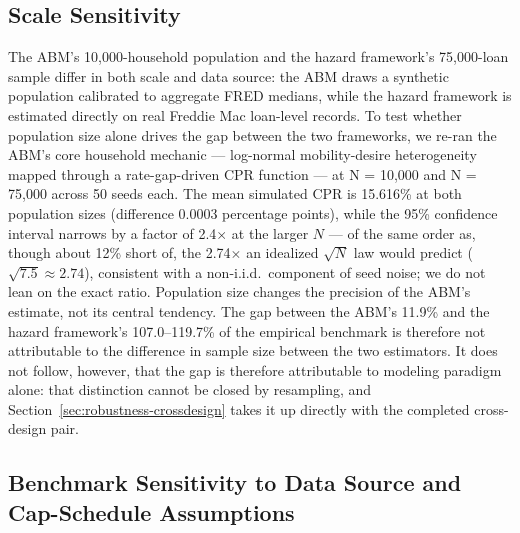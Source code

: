 \documentclass[12pt]{article}
\begin{document}
\subsection{Scale Sensitivity}\label{sec:robustness-scale}

The ABM's 10,000-household population and the hazard framework's 75,000-loan sample differ in both scale and data source: the ABM draws a synthetic population calibrated to aggregate FRED medians, while the hazard framework is estimated directly on real Freddie Mac loan-level records. To test whether population size alone drives the gap between the two frameworks, we re-ran the ABM's core household mechanic --- log-normal mobility-desire heterogeneity mapped through a rate-gap-driven CPR function --- at N = 10,000 and N = 75,000 across 50 seeds each. The mean simulated CPR is 15.616\% at both population sizes (difference 0.0003 percentage points), while the 95\% confidence interval narrows by a factor of 2.4$\times$ at the larger $N$ --- of the same order as, though about 12\% short of, the 2.74$\times$ an idealized $\sqrt{N}$ law would predict ($\sqrt{7.5} \approx 2.74$), consistent with a non-i.i.d.\ component of seed noise; we do not lean on the exact ratio. Population size changes the precision of the ABM's estimate, not its central tendency. The gap between the ABM's 11.9\% and the hazard framework's 107.0--119.7\% of the empirical benchmark is therefore not attributable to the difference in sample size between the two estimators. It does not follow, however, that the gap is therefore attributable to modeling paradigm alone: that distinction cannot be closed by resampling, and Section~\ref{sec:robustness-crossdesign} takes it up directly with the completed cross-design pair.

\subsection{Benchmark Sensitivity to Data Source and Cap-Schedule Assumptions}\label{sec:robustness-benchmark}
\end{document}

